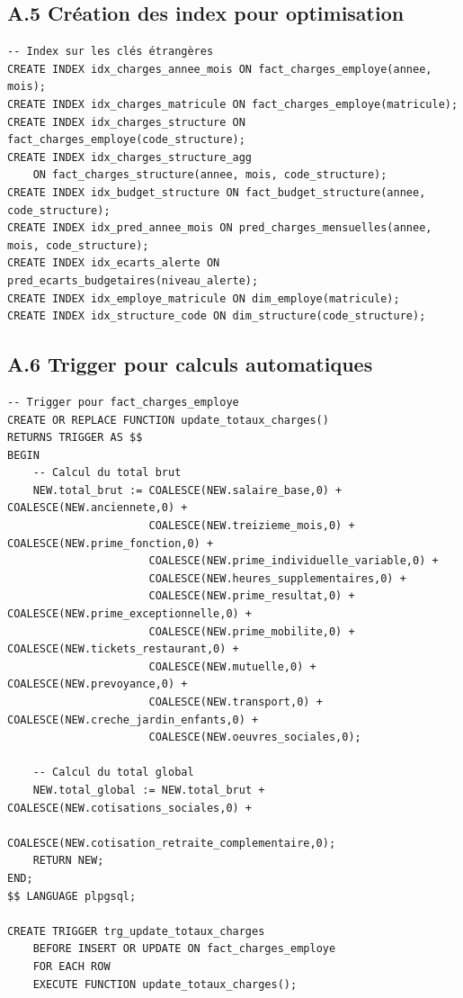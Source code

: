 \subsection*{A.5 Création des index pour optimisation}

\begin{verbatim}
-- Index sur les clés étrangères
CREATE INDEX idx_charges_annee_mois ON fact_charges_employe(annee, mois);
CREATE INDEX idx_charges_matricule ON fact_charges_employe(matricule);
CREATE INDEX idx_charges_structure ON fact_charges_employe(code_structure);
CREATE INDEX idx_charges_structure_agg 
    ON fact_charges_structure(annee, mois, code_structure);
CREATE INDEX idx_budget_structure ON fact_budget_structure(annee, code_structure);
CREATE INDEX idx_pred_annee_mois ON pred_charges_mensuelles(annee, mois, code_structure);
CREATE INDEX idx_ecarts_alerte ON pred_ecarts_budgetaires(niveau_alerte);
CREATE INDEX idx_employe_matricule ON dim_employe(matricule);
CREATE INDEX idx_structure_code ON dim_structure(code_structure);
\end{verbatim}

\subsection*{A.6 Trigger pour calculs automatiques}

\begin{verbatim}
-- Trigger pour fact_charges_employe
CREATE OR REPLACE FUNCTION update_totaux_charges()
RETURNS TRIGGER AS $$
BEGIN
    -- Calcul du total brut
    NEW.total_brut := COALESCE(NEW.salaire_base,0) + COALESCE(NEW.anciennete,0) + 
                      COALESCE(NEW.treizieme_mois,0) + COALESCE(NEW.prime_fonction,0) +
                      COALESCE(NEW.prime_individuelle_variable,0) + 
                      COALESCE(NEW.heures_supplementaires,0) +
                      COALESCE(NEW.prime_resultat,0) + COALESCE(NEW.prime_exceptionnelle,0) +
                      COALESCE(NEW.prime_mobilite,0) + COALESCE(NEW.tickets_restaurant,0) +
                      COALESCE(NEW.mutuelle,0) + COALESCE(NEW.prevoyance,0) +
                      COALESCE(NEW.transport,0) + COALESCE(NEW.creche_jardin_enfants,0) +
                      COALESCE(NEW.oeuvres_sociales,0);
    
    -- Calcul du total global
    NEW.total_global := NEW.total_brut + COALESCE(NEW.cotisations_sociales,0) + 
                        COALESCE(NEW.cotisation_retraite_complementaire,0);
    RETURN NEW;
END;
$$ LANGUAGE plpgsql;

CREATE TRIGGER trg_update_totaux_charges
    BEFORE INSERT OR UPDATE ON fact_charges_employe
    FOR EACH ROW
    EXECUTE FUNCTION update_totaux_charges();
\end{verbatim}

